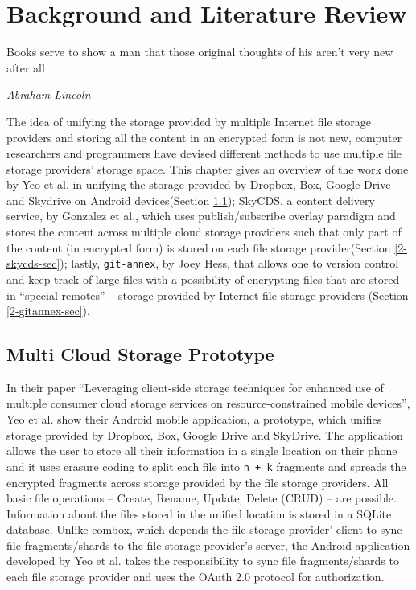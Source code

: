 \chapter{Background and Literature Review}

\epigraph{Books serve to show a man that those original thoughts of
  his aren't very new after all}{\textit{Abraham Lincoln}}

The idea of unifying the storage provided by multiple Internet file
storage providers and storing all the content in an encrypted form is
not new, computer researchers and programmers have devised different
methods to use multiple file storage providers' storage space. This
chapter gives an overview of the work done by Yeo et al. in unifying
the storage provided by Dropbox, Box, Google Drive and Skydrive on
Android devices\cite{yeo}(Section \ref{2-yeo-sec}); SkyCDS, a content
delivery service, by Gonzalez et al., which uses publish/subscribe
overlay paradigm and stores the content across multiple cloud storage
providers such that only part of the content (in encrypted form) is
stored on each file storage provider\cite{skycds}(Section
\ref{2-skycds-sec}); lastly, \verb+git-annex+, by Joey
Hess\cite{person:joeyh}, that allows one to version control and keep
track of large files with a possibility of encrypting files that are
stored in ``special remotes'' -- storage provided by Internet file
storage providers (Section \ref{2-gitannex-sec}).

\section{Multi Cloud Storage Prototype}\label{2-yeo-sec}

In their paper ``Leveraging client-side storage techniques for
enhanced use of multiple consumer cloud storage services on
resource-constrained mobile devices'', Yeo et al. show their Android
mobile application, a prototype, which unifies storage provided by
Dropbox, Box, Google Drive and SkyDrive. The application allows the
user to store all their information in a single location on their
phone and it uses erasure coding\cite{weatherspoon} to split each file
into \verb`n + k` fragments and spreads the encrypted fragments across
storage provided by the file storage providers. All basic file
operations -- Create, Rename, Update, Delete (CRUD) -- are
possible. Information about the files stored in the unified location
is stored in a SQLite database. Unlike combox, which depends the file
storage provider' client to sync file fragments/shards to the file
storage provider's server, the Android application developed by Yeo et
al. takes the responsibility to sync file fragments/shards to each
file storage provider and uses the OAuth 2.0\cite{protocol:oauth2}
protocol for authorization.

